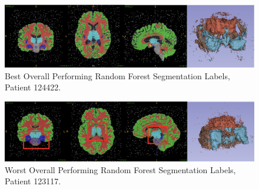 \begin{figure} [H]
	\centering
	\includegraphics[width=\textwidth]{"figures/rf_best"}
	\caption{Best Overall Performing Random Forest Segmentation Labels, Patient 124422.}
	\label{fig:rf-best}
\end{figure}

\begin{figure} [H]
	\centering
	\includegraphics[width=\textwidth]{"figures/rf_worst"}
	\caption{Worst Overall Performing Random Forest Segmentation Labels, Patient 123117.}
	\label{fig:rf-worst}
\end{figure}

